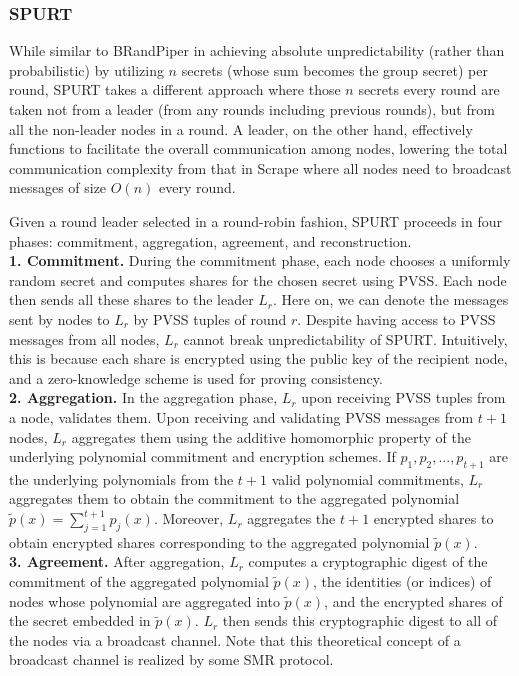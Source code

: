 \documentclass[11pt]{article}
\theoremstyle{definition}
\theoremstyle{remark}
\begin{document}
\subsubsection{SPURT}
While similar to BRandPiper in achieving absolute unpredictability (rather than probabilistic) by utilizing $n$ secrets (whose sum becomes the group secret) per round, SPURT takes a different approach where those $n$ secrets every round are taken not from a leader (from any rounds including previous rounds), but from all the non-leader nodes in a round. A leader, on the other hand, effectively functions to facilitate the overall communication among nodes, lowering the total communication complexity from that in Scrape where all nodes need to broadcast messages of size $O(n)$ every round.

Given a round leader selected in a round-robin fashion, SPURT proceeds in four phases: commitment, aggregation, agreement, and reconstruction.\\

\textbf{1. Commitment.} During the commitment phase, each node chooses a uniformly random secret and computes shares for the chosen secret using PVSS. Each node then sends all these shares to the leader $L_r$. Here on, we can denote the messages sent by nodes to $L_r$ by PVSS tuples of round $r$. Despite having access to PVSS messages from all nodes, $L_r$ cannot break unpredictability of SPURT. Intuitively, this is because each share is encrypted using the public key of the recipient node, and a zero-knowledge scheme is used for proving consistency.\\

\textbf{2. Aggregation.} In the aggregation phase, $L_r$ upon receiving PVSS tuples from a node, validates them. Upon receiving and validating PVSS messages from $t + 1$ nodes, $L_r$ aggregates them using the additive homomorphic property of the underlying polynomial commitment and encryption schemes. If $p_1, p_2, ..., p_{t + 1}$ are the underlying polynomials from the $t + 1$ valid polynomial commitments, $L_r$ aggregates them to obtain the commitment to the aggregated polynomial $\tilde{p}(x) = \sum_{j = 1}^{t + 1} p_j(x)$. Moreover, $L_r$ aggregates the $t + 1$ encrypted shares to obtain encrypted shares corresponding to the aggregated polynomial $\tilde{p}(x)$.\\

\textbf{3. Agreement.} After aggregation, $L_r$ computes a cryptographic digest of the commitment of the aggregated polynomial $\tilde{p}(x)$, the identities (or indices) of nodes whose polynomial are aggregated into $\tilde{p}(x)$, and the encrypted shares of the secret embedded in $\tilde{p}(x)$. $L_r$ then sends this cryptographic digest to all of the nodes via a broadcast channel. Note that this theoretical concept of a broadcast channel is realized by some SMR protocol.
\end{document}
